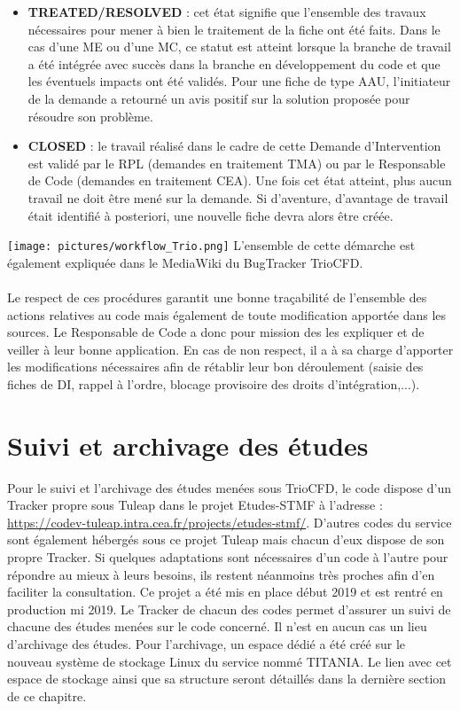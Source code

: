 \begin{itemize}[label=$\Rightarrow$, font=\LARGE]
   \item \textbf{TREATED/RESOLVED} : cet état signifie que l'ensemble des travaux nécessaires pour mener à bien le traitement de la fiche ont été faits. Dans le cas d'une ME ou d'une MC, ce statut est atteint lorsque la branche de travail a été intégrée avec succès dans la branche en développement du code et que les éventuels impacts ont été validés. Pour une fiche de type AAU, l'initiateur de la demande a retourné un avis positif sur la solution proposée pour résoudre son problème.
   \item \textbf{CLOSED} : le travail réalisé dans le cadre de cette Demande d'Intervention est validé par le RPL (demandes en traitement TMA) ou par le Responsable de Code (demandes en traitement CEA). Une fois cet état atteint, plus aucun travail ne doit être mené sur la demande. Si d'aventure, d'avantage de travail était identifié à posteriori, une nouvelle fiche devra alors être créée. 
\end{itemize}
\vspace*{0.5cm}
\texttt{[image: pictures/workflow\_Trio.png]}\vspace*{0.1cm}
\vspace*{1.5cm}
L'ensemble de cette démarche est également expliquée dans le MediaWiki du BugTracker TrioCFD. \\
\\ Le respect de ces procédures garantit une bonne tra\c cabilité de l'ensemble des actions relatives au code mais également de toute modification apportée dans les sources. Le Responsable de Code a donc pour mission des les expliquer et de veiller à leur bonne application. En cas de non respect, il a à sa charge d'apporter les modifications nécessaires afin de rétablir leur bon déroulement (saisie des fiches de DI, rappel à l'ordre, blocage provisoire des droits d'intégration,...).

\newpage
\chapter{Suivi et archivage des études}
Pour le suivi et l'archivage des études menées sous TrioCFD, le code dispose d'un Tracker propre sous Tuleap dans le projet Etudes-STMF à l'adresse : \url{https://codev-tuleap.intra.cea.fr/projects/etudes-stmf/}. D'autres codes du service sont également hébergés sous ce projet Tuleap mais chacun d'eux dispose de son propre Tracker. Si quelques adaptations sont nécessaires d'un code à l'autre pour répondre au mieux à leurs besoins, ils restent néanmoins très proches afin d'en faciliter la consultation. Ce projet a été mis en place début 2019 et est rentré en production mi 2019. Le Tracker de chacun des codes permet d'assurer un suivi de chacune des études menées sur le code concerné. Il n'est en aucun cas un lieu d'archivage des études. Pour l'archivage, un espace dédié a été créé sur le nouveau système de stockage Linux du service nommé TITANIA. Le lien avec cet espace de stockage ainsi que sa structure seront détaillés dans la dernière section de ce chapitre.
